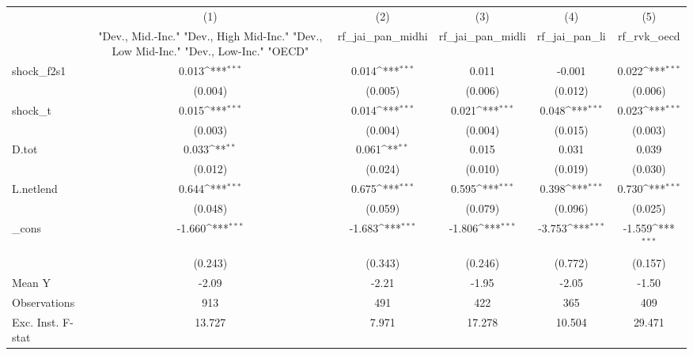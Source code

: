 {
\def\sym#1{\ifmmode^{#1}\else\(^{#1}\)\fi}
\begin{tabular}{l*{5}{c}}
\toprule
            &\multicolumn{1}{c}{(1)}&\multicolumn{1}{c}{(2)}&\multicolumn{1}{c}{(3)}&\multicolumn{1}{c}{(4)}&\multicolumn{1}{c}{(5)}\\
            &\multicolumn{1}{c}{ "Dev., Mid.-Inc." "Dev., High Mid-Inc." "Dev., Low Mid-Inc." "Dev., Low-Inc." "OECD" }&\multicolumn{1}{c}{rf\_jai\_pan\_midhi}&\multicolumn{1}{c}{rf\_jai\_pan\_midli}&\multicolumn{1}{c}{rf\_jai\_pan\_li}&\multicolumn{1}{c}{rf\_rvk\_oecd}\\
\midrule
shock\_f2s1  &       0.013\sym{***}&       0.014\sym{***}&       0.011         &      -0.001         &       0.022\sym{***}\\
            &     (0.004)         &     (0.005)         &     (0.006)         &     (0.012)         &     (0.006)         \\
\addlinespace
shock\_t     &       0.015\sym{***}&       0.014\sym{***}&       0.021\sym{***}&       0.048\sym{***}&       0.023\sym{***}\\
            &     (0.003)         &     (0.004)         &     (0.004)         &     (0.015)         &     (0.003)         \\
\addlinespace
D.tot       &       0.033\sym{**} &       0.061\sym{**} &       0.015         &       0.031         &       0.039         \\
            &     (0.012)         &     (0.024)         &     (0.010)         &     (0.019)         &     (0.030)         \\
\addlinespace
L.netlend   &       0.644\sym{***}&       0.675\sym{***}&       0.595\sym{***}&       0.398\sym{***}&       0.730\sym{***}\\
            &     (0.048)         &     (0.059)         &     (0.079)         &     (0.096)         &     (0.025)         \\
\addlinespace
\_cons      &      -1.660\sym{***}&      -1.683\sym{***}&      -1.806\sym{***}&      -3.753\sym{***}&      -1.559\sym{***}\\
            &     (0.243)         &     (0.343)         &     (0.246)         &     (0.772)         &     (0.157)         \\
\midrule
Mean Y      &       -2.09         &       -2.21         &       -1.95         &       -2.05         &       -1.50         \\
Observations&         913         &         491         &         422         &         365         &         409         \\
Exc. Inst. F-stat&      13.727         &       7.971         &      17.278         &      10.504         &      29.471         \\
\bottomrule
\end{tabular}
}
